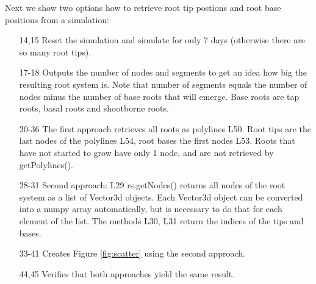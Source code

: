 \documentclass[a4paper]{article}
\begin{document}
Next we show two options how to retrieve root tip postions and root base positions from a simulation:



\begin{itemize}

\item[14,15] Reset the simulation and simulate for only 7 days (otherwise there are so many root tips).

\item[17-18] Outputs the number of nodes and segments to get an idea how big the resulting root system is. Note that number of segments equals the number of nodes minus the number of base roots that will emerge. Base roots are tap roots, basal roots and shootborne roots.

\item[20-36] The first approach retrieves all roots as polylines L50. Root tips are the last nodes of the polylines L54, root bases the first nodes L53. Roots that have not started to grow have only 1 node, and are not retrieved by getPolylines().

\item[28-31] Second approach: L29 rs.getNodes() returns all nodes of the root system as a list of Vector3d objects. Each Vector3d object can be converted into a numpy array automatically, but is necessary to do that for each element of the list. The methods L30, L31 return the indices of the tips and bases. 

\item[33-41] Creates Figure \ref{fig:scatter} using the second approach.

\item[44,45] Verifies that both approaches yield the same result.

\end{itemize}
\end{document}
